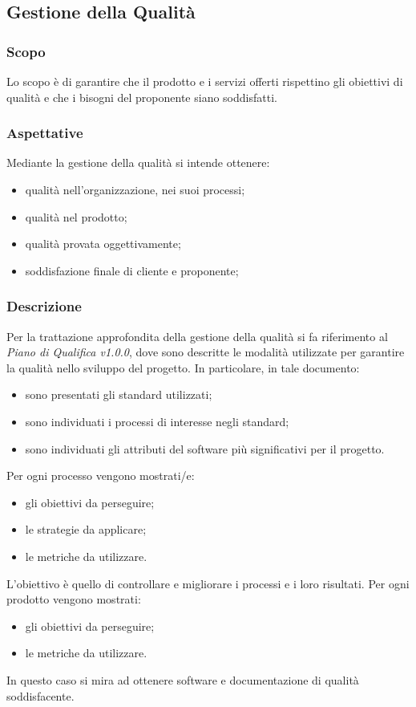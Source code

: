 \subsection{Gestione della Qualità}
	\subsubsection{Scopo}
	Lo scopo è di garantire che il prodotto e i servizi offerti rispettino gli obiettivi di qualità e che i bisogni del proponente siano soddisfatti.
	\subsubsection{Aspettative}
	Mediante la gestione della qualità si intende ottenere:
	\begin{itemize}
		\item qualità nell'organizzazione, nei suoi processi;
		\item qualità nel prodotto;
		\item qualità provata oggettivamente;
		\item soddisfazione finale di cliente e proponente;
	\end{itemize}
	\subsubsection{Descrizione}
	Per la trattazione approfondita della gestione della qualità si fa riferimento al \textit{Piano di Qualifica v1.0.0}, dove sono descritte le modalità utilizzate per garantire la qualità nello sviluppo del progetto. In particolare, in tale documento:
	\begin{itemize}
		\item sono presentati gli standard utilizzati;
		\item sono individuati i processi di interesse negli standard;
		\item sono individuati gli attributi del software più significativi per il progetto.
	\end{itemize}
	Per ogni processo vengono mostrati/e:
	\begin{itemize}
		\item gli obiettivi da perseguire;
		\item le strategie da applicare;
		\item le metriche da utilizzare.
	\end{itemize}
	L'obiettivo è quello di controllare e migliorare i processi e i loro risultati.
	Per ogni prodotto vengono mostrati:
	\begin{itemize}
		\item gli obiettivi da perseguire;
		\item le metriche da utilizzare.
	\end{itemize}
	In questo caso si mira ad ottenere software e documentazione di qualità soddisfacente.
